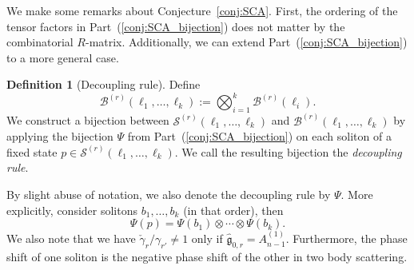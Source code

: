 \documentclass[reqno]{amsart}
\newcommand{\g}{\mathfrak{g}}
\newcommand{\Sol}{\mathcal{S}} %
\newcommand{\modgamma}{\check{\gamma}} %
\newcommand{\defn}[1]{{\color{darkred}\emph{#1}}} %
\theoremstyle{plain}
\theoremstyle{definition}
\newtheorem{dfn}[thm]{Definition}
\numberwithin{equation}{section}
\begin{document}
We make some remarks about Conjecture~\ref{conj:SCA}.
First, the ordering of the tensor factors in Part~(\ref{conj:SCA_bijection}) does not matter by the combinatorial $R$-matrix.
Additionally, we can extend Part~(\ref{conj:SCA_bijection}) to a more general case.
\begin{dfn}[Decoupling rule]
\label{def:decoupling}
Define
\[
\mathcal{B}^{(r)}(\ell_1, \dotsc, \ell_k) := \bigotimes_{i=1}^k \mathcal{B}^{(r)}(\ell_i).
\]
We construct a bijection between $\Sol^{(r)}(\ell_1, \dotsc, \ell_k)$ and $\mathcal{B}^{(r)}(\ell_1, \dotsc, \ell_k)$ by applying the bijection $\Psi$ from Part~(\ref{conj:SCA_bijection}) on each soliton of a fixed state $p \in \Sol^{(r)}(\ell_1, \dotsc, \ell_k)$.
We call the resulting bijection the \defn{decoupling rule}.
\end{dfn}
By slight abuse of notation, we also denote the decoupling rule by $\Psi$.
More explicitly, consider solitons $b_1, \dotsc, b_k$ (in that order), then
\[
\Psi(p) = \Psi(b_1) \otimes \cdots \otimes \Psi(b_k).
\]
We also note that we have $\modgamma_r / \gamma_{r'} \neq 1$ only if $\widehat{\g}_{0,r} = A_{n-1}^{(1)}$.
Furthermore, the phase shift of one soliton is the negative phase shift of the other in two body scattering.
\end{document}
